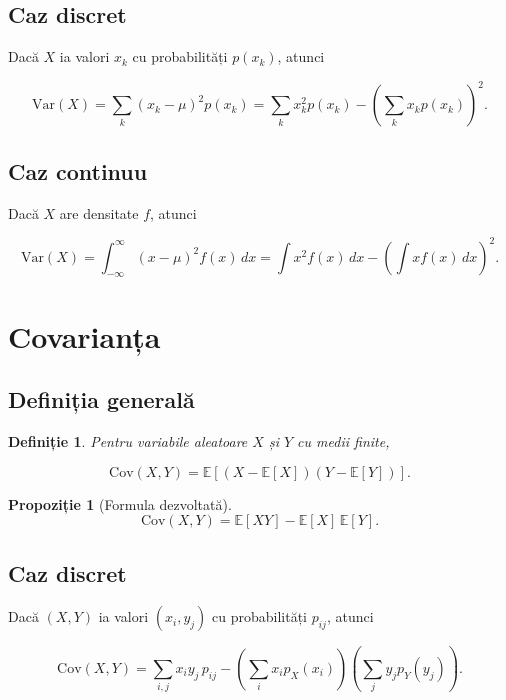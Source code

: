 \documentclass[12pt]{article}
\theoremstyle{plain}
\newtheorem{definition}{Definiție}
\newtheorem{proposition}{Propoziție}
\begin{document}
\subsection{Caz discret}

Dacă $X$ ia valori $x_k$ cu probabilități $p(x_k)$, atunci


\[
\mathrm{Var}(X)
= \sum_k (x_k - \mu)^2 p(x_k)
= \sum_k x_k^2 p(x_k) - \left(\sum_k x_k p(x_k)\right)^2.
\]



\subsection{Caz continuu}

Dacă $X$ are densitate $f$, atunci


\[
\mathrm{Var}(X)
= \int_{-\infty}^{\infty} (x - \mu)^2 f(x)\, dx
= \int x^2 f(x)\, dx - \left(\int x f(x)\, dx\right)^2.
\]



\section{Covarianța}

\subsection{Definiția generală}

\begin{definition}
Pentru variabile aleatoare $X$ și $Y$ cu medii finite,


\[
\mathrm{Cov}(X,Y)
= \mathbb{E}[(X - \mathbb{E}[X])(Y - \mathbb{E}[Y])].
\]


\end{definition}

\begin{proposition}[Formula dezvoltată]


\[
\mathrm{Cov}(X,Y)
= \mathbb{E}[XY] - \mathbb{E}[X]\,\mathbb{E}[Y].
\]


\end{proposition}

\subsection{Caz discret}

Dacă $(X,Y)$ ia valori $(x_i,y_j)$ cu probabilități $p_{ij}$, atunci


\[
\mathrm{Cov}(X,Y)
= \sum_{i,j} x_i y_j\, p_{ij}
- \left(\sum_i x_i p_X(x_i)\right)
  \left(\sum_j y_j p_Y(y_j)\right).
\]
\end{document}
